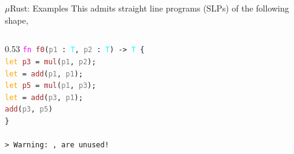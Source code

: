\documentclass{beamer}
\newcommand{\gap}{\;\;}
\begin{document}
\begin{frame}{$\mu$Rust: Examples}
  \hspace{-0.2cm}This admits straight line programs (SLPs) of the following shape,\vspace{0.5cm}
  \begin{small}
  \begin{columns}[T,onlytextwidth]
    \hspace{2.6cm}\begin{column}{0.53\textwidth}
       \texttt{\frenchspacing\:\textcolor{magenta}{fn} \textcolor{brown}{f0}(\textcolor{gray}{p1} : \textcolor{cyan}{T}, \textcolor{gray}{p2} : \textcolor{cyan}{T}) -> \textcolor{cyan}{T} \{}\\[0.18cm]
       \texttt{\frenchspacing\:\gap\gap\gap\textcolor{orange}{let} \textcolor{brown}{p3} = \textcolor{brown}{mul}(\textcolor{gray}{p1}, \textcolor{gray}{p2});}\\[0.18cm]
       \texttt{\frenchspacing\:\gap\gap\gap\textcolor{orange}{let} \ero{\textcolor{brown}{p4}} = \textcolor{brown}{add}(\textcolor{gray}{p1}, \textcolor{gray}{p1});}\\[0.18cm]
       \texttt{\frenchspacing\:\gap\gap\gap\textcolor{orange}{let} \textcolor{brown}{p5} = \textcolor{brown}{mul}(\textcolor{gray}{p1}, \textcolor{gray}{p3});}\\[0.18cm]
       \texttt{\frenchspacing\:\gap\gap\gap\textcolor{orange}{let} \ero{\textcolor{brown}{p6}} = \textcolor{brown}{add}(\textcolor{gray}{p3}, \textcolor{gray}{p1});}\\[0.18cm]
       \texttt{\frenchspacing\:\gap\gap\gap\textcolor{brown}{add}(\textcolor{gray}{p3}, \textcolor{gray}{p5})}\\[0.18cm]
       \texttt{\:\}}\\[0.18cm]\\[0.18cm]
       \texttt{\frenchspacing\:> Warning: \ero{\textcolor{brown}{p4}}, \ero{\textcolor{brown}{p6}} are unused!}
    \end{column}

\end{columns}
\end{small}
\end{frame}
\end{document}
